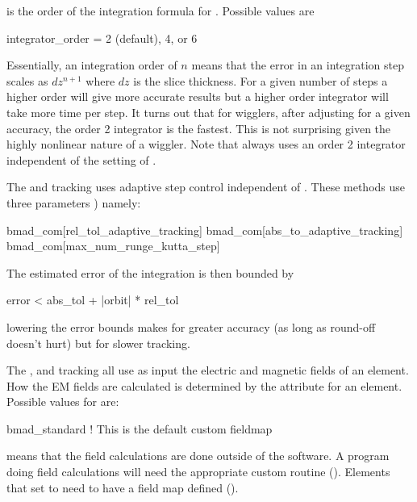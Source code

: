  is the order of the integration formula for 
. Possible values are
\begin{example}
  integrator_order = 2 (default), 4, or 6
\end{example}
Essentially, an integration order of $n$ means that the error in an
integration step scales as $dz^{n+1}$ where $dz$ is the slice
thickness.  For a given number of steps a higher order will give more
accurate results but a higher order integrator will take more time per
step. It turns out that for wigglers, after adjusting 
for a given accuracy, the order 2 integrator is the fastest. This is
not surprising given the highly nonlinear nature of a wiggler. Note
that  always uses an order 2 integrator
independent of the setting of .

The  and  tracking uses adaptive step
control independent of . These methods use three  parameters
) namely:
\begin{example}
  bmad_com[rel_tol_adaptive_tracking]
  bmad_com[abs_to_adaptive_tracking]
  bmad_com[max_num_runge_kutta_step]
\end{example}
The estimated error of the integration is then bounded by
\begin{example}
  error < abs_tol + |orbit| * rel_tol
\end{example}
lowering the error bounds makes for greater accuracy (as long as round-off 
doesn't hurt) but for slower tracking. 

The , and  tracking all use
as input the electric and magnetic fields of an element. How the EM fields
are calculated is determined by the  attribute for an element.
Possible values for  are:
\begin{example}
  bmad_standard     ! This is the default
  custom
  fieldmap
\end{example}
 means that the field calculations are done outside of the \bmad software. A program
doing  field calculations will need the appropriate custom routine
(). Elements that set  to  need to have a field map
defined ().

